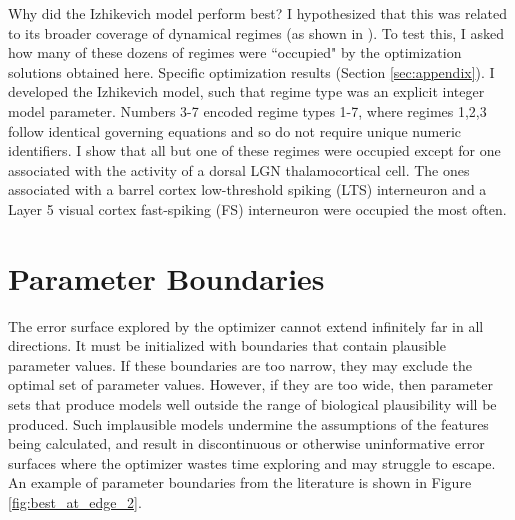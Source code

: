 Why did the Izhikevich model perform best? I hypothesized that this was related to its broader coverage of dynamical regimes (as shown in \citep{izhikevich2003simple}).
To test this, I asked how many of these dozens of regimes were ``occupied" by the optimization solutions obtained here. Specific optimization results (Section \ref{sec:appendix}). I developed the Izhikevich model, such that regime type was an explicit integer model parameter. Numbers 3-7 encoded regime types 1-7, where regimes 1,2,3 follow identical governing equations and so do not require unique numeric identifiers. I show that all but one of these regimes were occupied except for one associated with the activity of a dorsal LGN thalamocortical cell.
The ones associated with a barrel cortex low-threshold spiking (LTS) interneuron and a Layer 5 visual cortex fast-spiking (FS) interneuron were occupied the most often. 


\section{Parameter Boundaries}
The error surface explored by the optimizer cannot extend infinitely far in all directions.
It must be initialized with boundaries that contain plausible parameter values.
If these boundaries are too narrow, they may exclude the optimal set of parameter values.
However, if they are too wide, then parameter sets that produce models well outside the range of biological plausibility will be produced.
Such implausible models undermine the assumptions of the features being calculated, and result in discontinuous or otherwise uninformative error surfaces where the optimizer wastes time exploring and may struggle to escape.
An example of parameter boundaries from the literature is shown in Figure \ref{fig:best_at_edge_2}.

